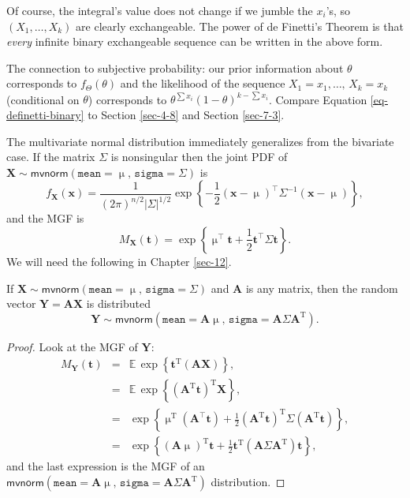 Of course, the integral's value does not change if we jumble the
\(x_{i}\)'s, so \((X_{1},\ldots,X_{k})\) are clearly exchangeable. The
power of de Finetti's Theorem is that \emph{every} infinite binary
exchangeable sequence can be written in the above form.

The connection to subjective probability: our prior information about
\(\theta\) corresponds to \(f_{\Theta}(\theta)\) and the likelihood of
the sequence \(X_{1}=x_{1},\ldots,\, X_{k}=x_{k}\) (conditional on
\(\theta\)) corresponds to \(\theta^{\sum x_{i}}(1-\theta)^{k-\sum
x_{i}}\). Compare Equation \eqref{eq-definetti-binary} to Section
\ref{sec-4-8} and Section \ref{sec-7-3}.

The multivariate normal distribution immediately generalizes from the
bivariate case. If the matrix \(\Sigma\) is nonsingular then the joint
PDF of
\(\mathbf{X}\sim\mathsf{mvnorm}(\mathtt{mean}=\upmu,\,\mathtt{sigma}=\Sigma)\)
is
\begin{equation}
f_{\mathbf{X}}(\mathbf{x})=\frac{1}{(2\pi)^{n/2}\left|\Sigma\right|^{1/2}}\exp\left\{ -\frac{1}{2}\left(\mathbf{x}-\upmu\right)^{\top}\Sigma^{-1}\left(\mathbf{x}-\upmu\right)\right\},
\end{equation}
and the MGF is
\begin{equation}
M_{\mathbf{X}}(\mathbf{t})=\exp\left\{ \upmu^{\top}\mathbf{t}+\frac{1}{2}\mathbf{t}^{\top}\Sigma\mathbf{t}\right\}.
\end{equation}
We will need the following in Chapter \ref{sec-12}.

\begin{thm}
\label{thm-mvnorm-dist-matrix-prod} If \(\mathbf{X} \sim
\mathsf{mvnorm}(\mathtt{mean} = \upmu, \, \mathtt{sigma} = \Sigma)\)
and \(\mathbf{A}\) is any matrix, then the random vector
\(\mathbf{Y}=\mathbf{AX}\) is distributed
\begin{equation}
\mathbf{Y}\sim\mathsf{mvnorm}(\mathtt{mean}=\mathbf{A}\upmu,\,\mathtt{sigma}=\mathbf{A}\Sigma\mathbf{A}^{\mathrm{T}}).
\end{equation}
\end{thm}

\begin{proof}
Look at the MGF of \(\mathbf{Y}\):
\begin{eqnarray*}
M_{\mathbf{Y}}(\mathbf{t}) & = & \mathbb{E}\,\exp\left\{ \mathbf{t}^{\mathrm{T}}(\mathbf{AX})\right\} ,\\
 & = & \mathbb{E}\,\exp\left\{ (\mathbf{A}^{\mathrm{T}}\mathbf{t})^{\mathrm{T}}\mathbf{X}\right\} ,\\
 & = & \exp\left\{ \upmu^{\mathrm{T}}(\mathbf{A}^{\top}\mathbf{t})+\frac{1}{2}(\mathbf{A}^{\mathrm{T}}\mathbf{t})^{\mathrm{T}}\Sigma(\mathbf{A}^{\mathrm{T}}\mathbf{t})\right\} ,\\
 & = & \exp\left\{ \left(\mathbf{A}\upmu\right)^{\mathrm{T}}\mathbf{t}+\frac{1}{2}\mathbf{t}^{\mathrm{T}}\left(\mathbf{A}\Sigma\mathbf{A}^{\mathrm{T}}\right)\mathbf{t}\right\},
\end{eqnarray*}
and the last expression is the MGF of an
\(\mathsf{mvnorm}(\mathtt{mean}=\mathbf{A}\upmu,\,\mathtt{sigma}=\mathbf{A}\Sigma\mathbf{A}^{\mathrm{T}})\)
distribution.
\end{proof}

